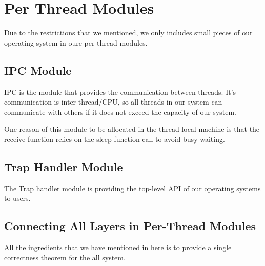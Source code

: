 \section{Per Thread Modules}
\label{chapter:certikos:sec:per-thread-modules}

Due to the restrictions that we mentioned,
we only includes small pieces of our operating system in oure per-thread modules.

\subsection{IPC Module}
\label{chapter:certikos:subsec:ipc-module}

IPC is the module that provides the communication between threads.
It's communication is inter-thread/CPU, so all threads in our system can communicate with others if it does not exceed the capacity of our system. 

One reason of this module to be allocated in the thread local machine is that 
the receive function relies on the sleep function call to avoid busy waiting. 

\subsection{Trap Handler Module}
\label{chapter:certikos:subsec:trap-handler-module}

The Trap handler module is providing the top-level API of our operating systems to users.  

\subsection{Connecting All Layers in Per-Thread Modules}
\label{chapter:certikos:subsec:per-thread-layers-connect}

All the ingredients that we have mentioned in here is to provide a single correctness 
theorem for the all system. 
